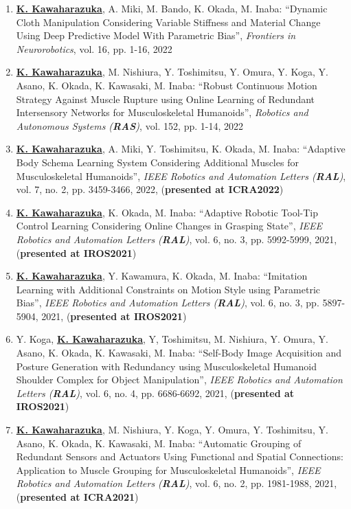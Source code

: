 \documentclass[letterpaper]{article}
\begin{document}
\begin{enumerate}
\item \underline{\textbf{K. Kawaharazuka}}, A. Miki, M. Bando, K. Okada, M. Inaba: ``Dynamic Cloth Manipulation Considering Variable Stiffness and Material Change Using Deep Predictive Model With Parametric Bias'', \textit{Frontiers in Neurorobotics}, vol. 16, pp. 1-16, 2022
\item \underline{\textbf{K. Kawaharazuka}}, M. Nishiura, Y. Toshimitsu, Y. Omura, Y. Koga, Y. Asano, K. Okada, K. Kawasaki, M. Inaba: ``Robust Continuous Motion Strategy Against Muscle Rupture using Online Learning of Redundant Intersensory Networks for Musculoskeletal Humanoids'', \textit{Robotics and Autonomous Systems (\textit{\textbf{RAS}})}, vol. 152, pp. 1-14, 2022
\item \underline{\textbf{K. Kawaharazuka}}, A. Miki, Y. Toshimitsu, K. Okada, M. Inaba: ``Adaptive Body Schema Learning System Considering Additional Muscles for Musculoskeletal Humanoids'', \textit{IEEE Robotics and Automation Letters (\textit{\textbf{RAL}})}, vol. 7, no. 2, pp. 3459-3466, 2022, (\textbf{presented at ICRA2022})
\item \underline{\textbf{K. Kawaharazuka}}, K. Okada, M. Inaba: ``Adaptive Robotic Tool-Tip Control Learning Considering Online Changes in Grasping State'', \textit{IEEE Robotics and Automation Letters (\textit{\textbf{RAL}})}, vol. 6, no. 3, pp. 5992-5999, 2021, (\textbf{presented at IROS2021})
\item \underline{\textbf{K. Kawaharazuka}}, Y. Kawamura, K. Okada, M. Inaba: ``Imitation Learning with Additional Constraints on Motion Style using Parametric Bias'', \textit{IEEE Robotics and Automation Letters (\textit{\textbf{RAL}})}, vol. 6, no. 3, pp. 5897-5904, 2021, (\textbf{presented at IROS2021})
\item Y. Koga, \underline{\textbf{K. Kawaharazuka}}, Y, Toshimitsu, M. Nishiura, Y. Omura, Y. Asano, K. Okada, K. Kawasaki, M. Inaba: ``Self-Body Image Acquisition and Posture Generation with Redundancy using Musculoskeletal Humanoid Shoulder Complex for Object Manipulation'', \textit{IEEE Robotics and Automation Letters (\textit{\textbf{RAL}})}, vol. 6, no. 4, pp. 6686-6692, 2021, (\textbf{presented at IROS2021})
\item \underline{\textbf{K. Kawaharazuka}}, M. Nishiura, Y. Koga, Y. Omura, Y. Toshimitsu, Y. Asano, K. Okada, K. Kawasaki, M. Inaba: ``Automatic Grouping of Redundant Sensors and Actuators Using Functional and Spatial Connections: Application to Muscle Grouping for Musculoskeletal Humanoids'', \textit{IEEE Robotics and Automation Letters (\textit{\textbf{RAL}})}, vol. 6, no. 2, pp. 1981-1988, 2021, (\textbf{presented at ICRA2021})

\end{enumerate}
\end{document}
